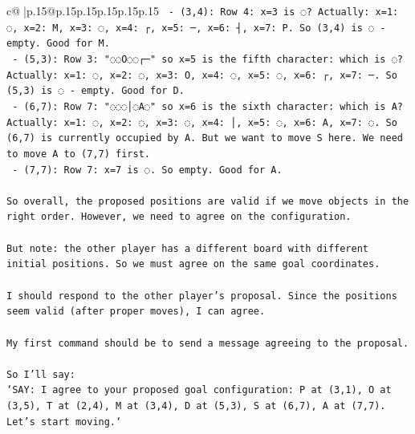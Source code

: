 \documentclass{article}
\begin{document}
{\begin{supertabular}{c@{$\;$}|p{.15\linewidth}@{}p{.15\linewidth}p{.15\linewidth}p{.15\linewidth}p{.15\linewidth}p{.15\linewidth}}
{{{\texttt{   {-} (3,4): Row 4: x=3 is ◌? Actually: x=1: ◌, x=2: M, x=3: ◌, x=4: ┌, x=5: ─, x=6: ┤, x=7: P. So (3,4) is ◌ {-} empty. Good for M.} \\
\texttt{   {-} (5,3): Row 3: "◌◌O◌◌┌─" so x=5 is the fifth character: which is ◌? Actually: x=1: ◌, x=2: ◌, x=3: O, x=4: ◌, x=5: ◌, x=6: ┌, x=7: ─. So (5,3) is ◌ {-} empty. Good for D.} \\
\texttt{   {-} (6,7): Row 7: "◌◌◌│◌A◌" so x=6 is the sixth character: which is A? Actually: x=1: ◌, x=2: ◌, x=3: ◌, x=4: │, x=5: ◌, x=6: A, x=7: ◌. So (6,7) is currently occupied by A. But we want to move S here. We need to move A to (7,7) first.} \\
\texttt{   {-} (7,7): Row 7: x=7 is ◌. So empty. Good for A.} \\
\\ 
\texttt{So overall, the proposed positions are valid if we move objects in the right order. However, we need to agree on the configuration.} \\
\\ 
\texttt{But note: the other player has a different board with different initial positions. So we must agree on the same goal coordinates.} \\
\\ 
\texttt{I should respond to the other player's proposal. Since the positions seem valid (after proper moves), I can agree.} \\
\\ 
\texttt{My first command should be to send a message agreeing to the proposal.} \\
\\ 
\texttt{So I'll say:} \\
\texttt{`SAY: I agree to your proposed goal configuration: P at (3,1), O at (3,5), T at (2,4), M at (3,4), D at (5,3), S at (6,7), A at (7,7). Let's start moving.`} \\
            }
        }
    }
     \\ \\


\end{supertabular}}
\end{document}
